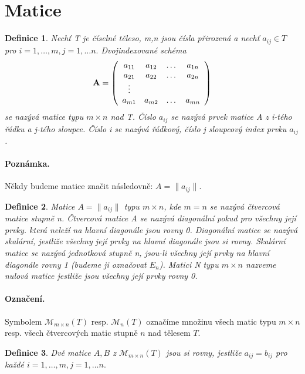 \documentclass[12pt,a4paper]{article}
\newtheorem{definition}{Definice}
\begin{document}
\section{Matice}
\begin{definition}
	Nechť T je číselné těleso, m,n jsou čísla přirozená a nechť $a_{ij} \in T$  pro $i = 1, \dots, m, j = 1, \dots n.$ Dvojindexované schéma
\begin{displaymath}
{\bf A} =
\left( \begin{array}{cccc}
a_{11} & a_{12} & \dots & a_{1n} \\
a_{21} & a_{22} & \dots & a_{2n} \\
\vdots &  &  &  \\
a_{m1} & a_{m2} & \dots & a_{mn} \\
\end{array} \right)
\end{displaymath}
se nazývá matice typu $m \times n$ nad T. Číslo $a_{ij}$ se nazývá prvek matice A z i-tého řádku a j-tého sloupce. Číslo i se nazývá řádkový, číslo j sloupcový index prvku $a_{ij}$.
\end{definition}

\paragraph{Poznámka.} Někdy budeme matice značit následovně: $A = \| a_{ij}\|$.

\begin{definition}
	Matice $A = \|a_{ij}\|$ typu $m \times n$, kde $m = n$ se nazývá čtvercová matice stupně n. Čtvercová matice A se nazývá diagonální pokud pro všechny její prvky. která neleží na hlavní diagonále jsou rovny 0. Diagonální matice se nazývá skalární, jestliže všechny její prvky na hlavní diagonále jsou si rovny. Skalární matice se nazývá jednotková stupně n, jsou-li všechny její prvky na hlavní diagonále rovny 1 (budeme ji označovat $E_n$). Matici N typu $m \times n$ nazveme nulová matice jestliže jsou všechny její prvky rovny 0.
\end{definition}

\paragraph{Označení.} Symbolem $\mathscr{M}_{m \times n}(T)$ resp. $\mathscr{M}_{n}(T)$ označíme množinu všech matic typu $m \times n$ resp. všech čtvercových matic stupně $n$ nad tělesem $T$.

\begin{definition}
	Dvě matice $A,B$ z $\mathscr{M}_{m \times n}(T)$ jsou si rovny, jestliže $a_{ij} = b_{ij}$ pro každé  $i = 1, \dots, m, j = 1, \dots n.$
\end{definition}
\end{document}
